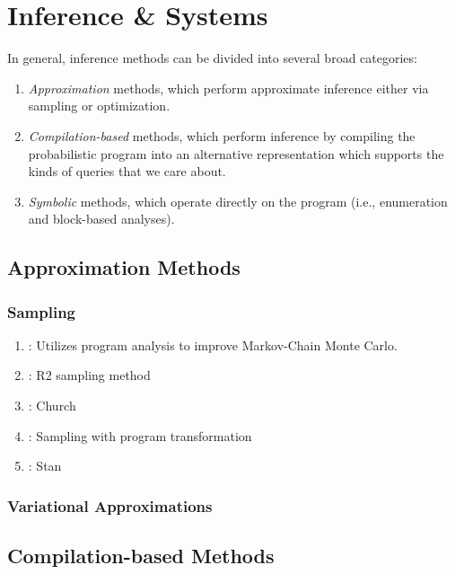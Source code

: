 \documentclass{article}
\begin{document}
\section{Inference \& Systems}
In general, inference methods can be divided into several broad categories:
\begin{enumerate}
\item \emph{Approximation} methods, which perform approximate inference either
  via sampling or optimization.
\item \emph{Compilation-based} methods, which perform inference by compiling
  the probabilistic program into an alternative representation which supports
  the kinds of queries that we care about.
\item \emph{Symbolic} methods, which operate directly on the program (i.e.,
  enumeration and block-based analyses).
\end{enumerate}

\subsection{Approximation Methods}

\subsubsection{Sampling}

\begin{enumerate}
\item \citep{Hur2015}: Utilizes program analysis to improve Markov-Chain Monte Carlo.
\item \citep{nori2014r2}: R2 sampling method
\item \citep{goodman2012church}: Church
\item \citep{wingate2011lightweight}: Sampling with program transformation
\item \citep{carpenter2017stan}: Stan
\end{enumerate}

\subsubsection{Variational Approximations}

\subsection{Compilation-based Methods}
\end{document}

